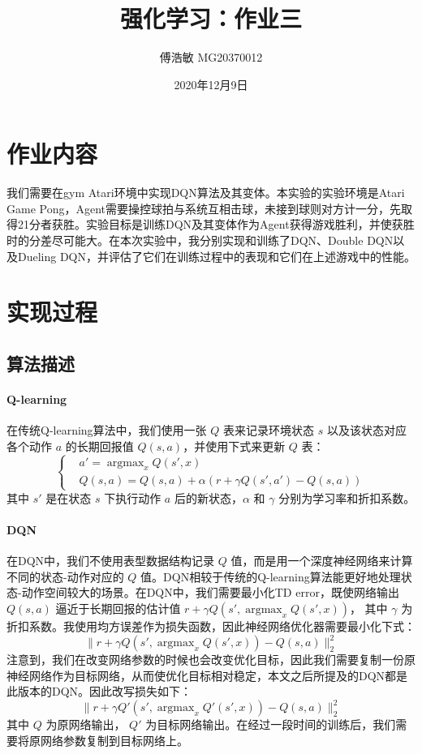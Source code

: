 \documentclass[a4paper,12pt]{article}
\begin{document}
\begin{CJK}{UTF8}{gbsn}

\title{强化学习：作业三}

\author{傅浩敏 MG20370012}

\date{2020年12月9日}

\maketitle

\section{作业内容}
我们需要在gym Atari环境中实现DQN算法及其变体。本实验的实验环境是Atari Game Pong，Agent需要操控球拍与系统互相击球，未接到球则对方计一分，先取得21分者获胜。实验目标是训练DQN及其变体作为Agent获得游戏胜利，并使获胜时的分差尽可能大。在本次实验中，我分别实现和训练了DQN\cite{ref1}\cite{ref2}、Double DQN\cite{ref3}以及Dueling DQN\cite{ref4}，并评估了它们在训练过程中的表现和它们在上述游戏中的性能。

\section{实现过程}
\subsection{算法描述}
\paragraph{Q-learning\cite{ref5}} 在传统Q-learning算法中，我们使用一张 $Q$ 表来记录环境状态 $s$ 以及该状态对应各个动作 $a$ 的长期回报值 $Q(s,a)$，并使用下式来更新 $Q$ 表：
$$
\begin{cases}
	&a'= \mathop{\arg\max}_{x} Q(s',x)\\
	&Q(s,a)=Q(s,a)+\alpha(r+\gamma Q(s',a')-Q(s,a)) 
\end{cases}
$$
其中 $s'$ 是在状态 $s$ 下执行动作 $a$ 后的新状态，$\alpha$ 和 $\gamma$ 分别为学习率和折扣系数。
\paragraph{DQN} 在DQN中，我们不使用表型数据结构记录 $Q$ 值，而是用一个深度神经网络来计算不同的状态-动作对应的 $Q$ 值。DQN相较于传统的Q-learning算法能更好地处理状态-动作空间较大的场景。在DQN中，我们需要最小化TD error，既使网络输出 $Q(s,a)$ 逼近于长期回报的估计值 $r+\gamma Q(s',\mathop{\arg\max}_{x} Q(s',x))$， 其中 $\gamma$ 为折扣系数。我使用均方误差作为损失函数，因此神经网络优化器需要最小化下式：
$$
\|r+\gamma Q(s',\mathop{\arg\max}_{x} Q(s',x))-Q(s,a)\|_2^2
$$
注意到，我们在改变网络参数的时候也会改变优化目标，因此我们需要复制一份原神经网络作为目标网络，从而使优化目标相对稳定，本文之后所提及的DQN都是此版本的DQN\cite{ref2}。因此改写损失如下：
$$
\|r+\gamma Q'(s',\mathop{\arg\max}_{x} Q'(s',x))-Q(s,a)\|_2^2
$$
其中 $Q$ 为原网络输出， $Q'$ 为目标网络输出。在经过一段时间的训练后，我们需要将原网络参数复制到目标网络上。

\end{CJK}
\end{document}
